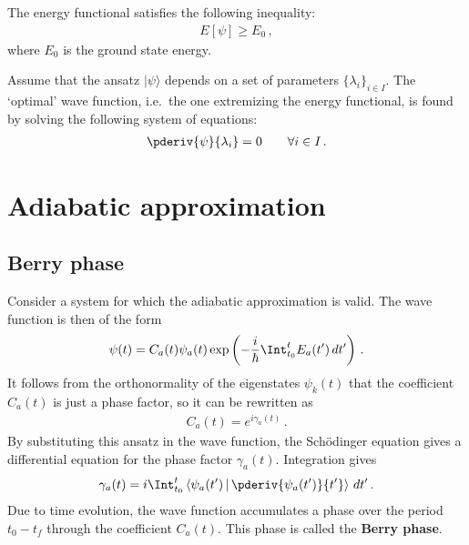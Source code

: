 
    \begin{property}
        The energy functional satisfies the following inequality:
        \begin{gather}
            E[\psi]\geq E_0\,,
        \end{gather}
        where $E_0$ is the ground state energy.
    \end{property}

    \begin{method}
        Assume that the ansatz $|\psi\rangle$ depends on a set of parameters $\{\lambda_i\}_{i\in I}$. The `optimal' wave function, i.e.~the one extremizing the energy functional, is found by solving the following system of equations:
        \begin{gather}
            \pderiv{\psi}{\lambda_i} = 0\qquad\forall i\in I\,.
        \end{gather}
    \end{method}

\section{Adiabatic approximation}
\subsection{Berry phase}

    Consider a system for which the adiabatic approximation is valid. The wave function is then of the form
    \begin{gather}
        \psi(t) = C_a(t)\psi_a(t)\exp\left(-\frac{i}{\hbar}\Int_{t_0}^tE_a(t')\,dt'\right)\,.
    \end{gather}
    It follows from the orthonormality of the eigenstates $\psi_k(t)$ that the coefficient $C_a(t)$ is just a phase factor, so it can be rewritten as
    \begin{gather}
        C_a(t) = e^{i\gamma_a(t)}\,.
    \end{gather}
    By substituting this ansatz in the wave function, the Sch\"odinger equation gives a differential equation for the phase factor $\gamma_a(t)$. Integration gives
    \begin{gather}
        \label{perturbation:phase_factor}
        \gamma_a(t) = i\Int_{t_0}^t\left\langle\psi_a(t')\,\middle\vert\,\pderiv{\psi_a(t')}{t'}\right\rangle\,dt'\,.
    \end{gather}
    Due to time evolution, the wave function accumulates a phase over the period $t_0-t_f$ through the coefficient $C_a(t)$. This phase is called the \textbf{Berry phase}.

